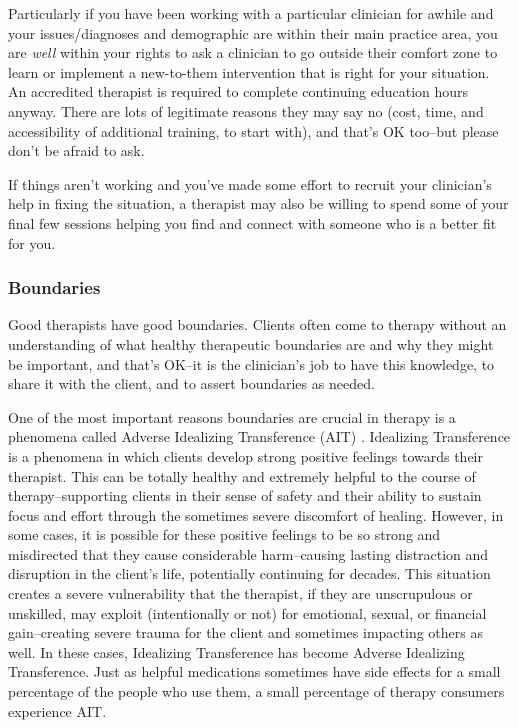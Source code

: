 \documentclass[12pt,letterpaper]{book}
\begin{document}
Particularly if you have been working with a particular clinician for awhile and your issues/diagnoses and demographic are within their main practice area, you are \textit{well} within your rights to ask a clinician to go outside their comfort zone to learn or implement a new-to-them intervention that is right for your situation. An accredited therapist is required to complete continuing education hours anyway. There are lots of legitimate reasons they may say no (cost, time, and accessibility of additional training, to start with), and that's OK too–but please don't be afraid to ask.

If things aren't working and you've made some effort to recruit your clinician's help in fixing the situation, a therapist may also be willing to spend some of your final few sessions helping you find and connect with someone who is a better fit for you.

\subsubsection*{Boundaries}
Good therapists have good boundaries. Clients often come to therapy without an understanding of what healthy therapeutic boundaries are and why they might be important, and that's OK–it is the clinician's job to have this knowledge, to share it with the client, and to assert boundaries as needed.

\label{def:ait}
One of the most important reasons boundaries are crucial in therapy is a phenomena called Adverse Idealizing Transference (AIT) \cite{hook2018boundary,transferranceLoveHarm}. Idealizing Transference is a phenomena in which clients develop strong positive feelings towards their therapist. This can be totally healthy and extremely helpful to the course of therapy–supporting clients in their sense of safety and their ability to sustain focus and effort through the sometimes severe discomfort of healing. However, in some cases, it is possible for these positive feelings to be so strong and misdirected that they cause considerable harm–causing lasting distraction and disruption in the client's life, potentially continuing for decades. This situation creates a severe vulnerability that the therapist, if they are unscrupulous or unskilled, may exploit (intentionally or not) for emotional, sexual, or financial gain–creating severe trauma for the client and sometimes impacting others as well. In these cases, Idealizing Transference has become Adverse Idealizing Transference. Just as helpful medications sometimes have side effects for a small percentage of the people who use them, a small percentage of therapy consumers experience AIT.
\end{document}
